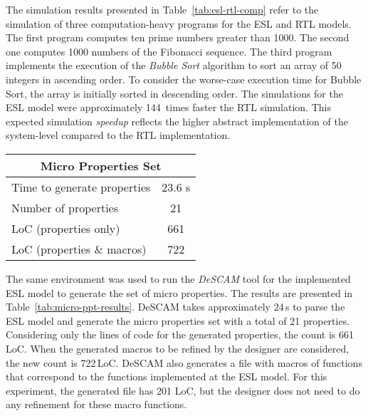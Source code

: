 The simulation results presented in Table~\ref{tab:esl-rtl-comp} refer to the simulation of three computation-heavy programs for the ESL and RTL models. The first program computes ten prime numbers greater than 1000. The second one computes 1000 numbers of the Fibonacci sequence. The third program implements the execution of the \textit{Bubble Sort} algorithm to sort an array of 50 integers in ascending order. To consider the worse-case execution time for Bubble Sort, the array is initially sorted in descending order. The simulations for the ESL model were approximately 144~times faster the RTL simulation. This expected simulation \textit{speedup} reflects the higher abstract implementation of the system-level compared to the RTL implementation.

\begin{table*}[htb!] 
	\centering 
	\caption{Results for micro properties generated by DeSCAM from the RI5CY ESL model.} 
	\label{tab:micro-ppt-results}
	\begin{tabular}{p{6cm} c } 
		\multicolumn{2}{c}{\textbf{Micro Properties Set}} \\  
		\hline	
		Time to generate properties  &  23.6 s  \\
		Number of properties  &  21 \\
		LoC (properties only)  &  661 \\
		LoC (properties \& macros)  &  722\\
	\end{tabular} 
\end{table*}

The same environment was used to run the \textit{DeSCAM} tool for the implemented ESL model to generate the set of micro properties. The results are presented in Table~\ref{tab:micro-ppt-results}. DeSCAM takes approximately 24\,s to parse the ESL model and generate the micro properties set with a total of 21 properties. Considering only the lines of code for the generated properties, the count is 661\,LoC. When the generated macros to be refined by the designer are considered, the new count is 722\,LoC. DeSCAM also generates a file with macros of functions that correspond to the functions implemented at the ESL model. For this experiment, the generated file has 201 LoC, but the designer does not need to do any refinement for these macro functions.  


